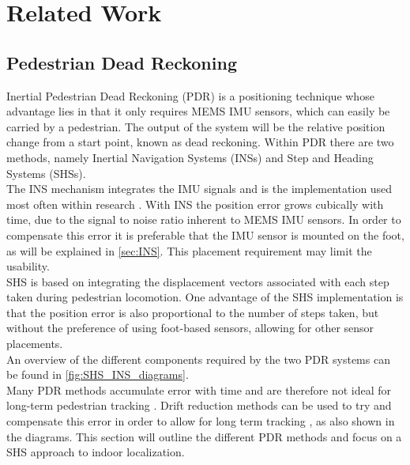 \chapter{Related Work}


\section{Pedestrian Dead Reckoning}
Inertial Pedestrian Dead Reckoning (PDR) is a positioning technique whose advantage lies in that it only requires MEMS IMU sensors, which can easily be carried by a pedestrian. The output of the system will be the relative position change from a start point, known as dead reckoning. Within PDR there are two methods, namely Inertial Navigation Systems (INSs) and Step and Heading Systems (SHSs).\\
The INS mechanism integrates the IMU signals and is the implementation used most often within research \cite{Diez2018b}. With INS the position error grows cubically with time, due to the signal to noise ratio inherent to MEMS IMU sensors\cite{Harle2013}. In order to compensate this error it is preferable  that the IMU sensor is mounted on the foot, as will be explained in \cref{sec:INS}. This placement requirement may limit the usability. \\
SHS is based on integrating the displacement vectors associated with each step taken during pedestrian locomotion. One advantage of the SHS implementation is that the position error is also proportional to the number of steps taken, but without the preference of using foot-based sensors, allowing for other sensor placements. \\
An overview of the different components required by the two PDR systems can be found in \cref{fig:SHS_INS_diagrams}.\\ Many PDR methods accumulate error with time and are therefore not ideal for long-term pedestrian tracking \cite{Hardegger2012}. Drift reduction methods can be used to try and compensate this error in order to allow for long term tracking \cite{MunozDiaz2019a}, as also shown in the diagrams. This section will outline the different PDR methods and focus on a SHS approach to indoor localization.

